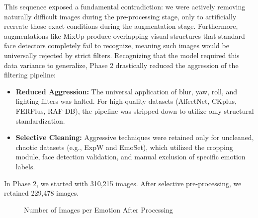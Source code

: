 This sequence exposed a fundamental contradiction: we were actively removing naturally difficult images during the pre-processing stage, only to artificially recreate those exact conditions during the augmentation stage. Furthermore, augmentations like MixUp produce overlapping visual structures that standard face detectors completely fail to recognize, meaning such images would be universally rejected by strict filters. Recognizing that the model required this data variance to generalize, Phase 2 drastically reduced the aggression of the filtering pipeline:
\begin{itemize}
    \item \textbf{Reduced Aggression:} The universal application of blur, yaw, roll, and lighting filters was halted. For high-quality datasets (AffectNet, CKplus, FERPlus, RAF-DB), the pipeline was stripped down to utilize only structural standardization.
    \item \textbf{Selective Cleaning:} Aggressive techniques were retained only for uncleaned, chaotic datasets (e.g., ExpW and EmoSet), which utilized the cropping module, face detection validation, and manual exclusion of specific emotion labels.
\end{itemize}
In Phase 2, we started with 310,215 images. After selective pre-processing, we retained 229,478 images.


\begin{figure}[h]
\centering
{}
\caption{Number of Images per Emotion After Processing}
\label{fig:processed_images_distribution}
\end{figure}

